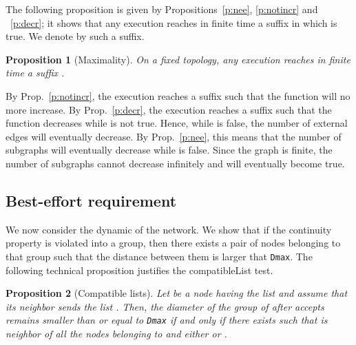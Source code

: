 \documentclass[11pt,english]{article}
\newtheorem{proposition}{Proposition}
\newenvironment{proof}[1][0cm]{
  \begin{list}{\bf Proof.~}{
      \setlength{\itemindent}{0cm}
      \setlength{\labelsep}{0cm}
      \setlength{\labelwidth}{#1}
      \setlength{\leftmargin}{#1}
    \item
    }
}{\hfill
  \end{list}
}
\begin{document}
The following proposition is given by Propositions~\ref{p:nee}, \ref{p:notincr}
and ~\ref{p:decr}; it shows that any execution reaches in finite time a suffix
in which  is true. We denote by  such a suffix.

\begin{proposition}[Maximality]\label{p:max}
  On a fixed topology, any execution  reaches in finite time a suffix
  .
\end{proposition}

\begin{proof}
  By Prop.~\ref{p:notincr}, the execution reaches a suffix 
  such that the  function will no more increase.  By Prop.~\ref{p:decr},
  the execution reaches a suffix  such that the  function
  decreases while  is not true.  Hence, while  is false, the
  number of external edges will eventually decrease. By Prop.~\ref{p:nee}, this
  means that the number of subgraphs will eventually decrease while  is
  false. Since the graph is finite, the number of subgraphs cannot decrease
  infinitely and  will eventually become true.
\end{proof}


\subsection{Best-effort requirement}

We now consider the dynamic of the network.  We show that if the continuity
property is violated into a group, then there exists a pair of nodes belonging
to that group such that the distance between them is larger that
\texttt{Dmax}. The following technical proposition justifies the compatibleList
test.

\begin{proposition}[Compatible lists]\label{p:compatible}
Let  be a node having the list    and assume
that its neighbor  sends the list .
Then, the diameter of the group of  after  accepts  remains smaller than or equal to
\texttt{Dmax} if and only if there exists  such that  is neighbor of all the nodes belonging to 
and either  or .
\end{proposition}
\end{document}
